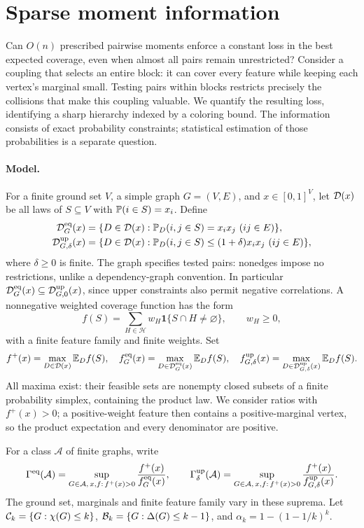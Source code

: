 \section{Sparse moment information}\label{sec:intro}

Can \(O(n)\) prescribed pairwise moments enforce a constant loss in the
best expected coverage, even when almost all pairs remain unrestricted?
Consider a coupling that selects an entire block: it can cover every
feature while keeping each vertex's marginal small. Testing pairs within
blocks restricts precisely the collisions that make this coupling valuable.
We quantify the resulting loss, identifying a sharp hierarchy indexed by
a coloring bound. The information consists of exact probability constraints;
statistical estimation of those probabilities is a separate question.

\paragraph{Model.}
For a finite ground set \(V\), a simple graph \(G=(V,E)\), and
\(x\in[0,1]^V\), let \(\mathcal D(x)\) be all laws of \(S\subseteq V\)
with \(\mathbb P(i\in S)=x_i\). Define
\begin{align*}
\mathcal D_G^{\mathrm{eq}}(x)&=\{D\in\mathcal D(x):\mathbb P_D(i,j\in S)=x_ix_j\ (ij\in E)\},\\
\mathcal D_{G,\delta}^{\mathrm{up}}(x)&=\{D\in\mathcal D(x):\mathbb P_D(i,j\in S)\leq(1+\delta)x_ix_j\ (ij\in E)\},
\end{align*}
where \(\delta\geq0\) is finite. The graph specifies tested pairs:
nonedges impose no restrictions, unlike a dependency-graph convention.
In particular \(\mathcal D_G^{\mathrm{eq}}(x)\subseteq\mathcal D_{G,0}^{\mathrm{up}}(x)\), since
upper constraints also permit negative correlations.
A nonnegative weighted coverage function has the form
\[
 f(S)=\sum_{H\in\mathcal H}w_H\mathbf1\{S\cap H\ne\varnothing\},
 \qquad w_H\geq0,
\]
with a finite feature family and finite weights. Set
\[
 f^+(x)=\max_{D\in\mathcal D(x)}\mathbb E_D f(S),\quad
 f_G^{\mathrm{eq}}(x)=\max_{D\in\mathcal D_G^{\mathrm{eq}}(x)}\mathbb E_D f(S),\quad
 f_{G,\delta}^{\mathrm{up}}(x)=\max_{D\in\mathcal D_{G,\delta}^{\mathrm{up}}(x)}\mathbb E_D f(S).
\]
All maxima exist: their feasible sets are nonempty closed subsets of a finite
probability simplex, containing the product law. We consider ratios with
\(f^+(x)>0\); a positive-weight feature then contains a positive-marginal
vertex, so the product expectation and every denominator are positive.

For a class \(\mathcal A\) of finite graphs, write
\[
 \Gamma^{\mathrm{eq}}(\mathcal A)=\sup_{G\in\mathcal A,\,x,f:\,f^+(x)>0}
 \frac{f^+(x)}{f_G^{\mathrm{eq}}(x)},\qquad
 \Gamma_\delta^{\mathrm{up}}(\mathcal A)=\sup_{G\in\mathcal A,\,x,f:\,f^+(x)>0}
 \frac{f^+(x)}{f_{G,\delta}^{\mathrm{up}}(x)}.
\]
The ground set, marginals and finite feature family vary in these suprema.
Let \(\mathcal C_k=\{G:\chi(G)\leq k\}\), \(\mathcal B_k=\{G:\Delta(G)\leq k-1\}\),
and \(\alpha_k=1-(1-1/k)^k\).

